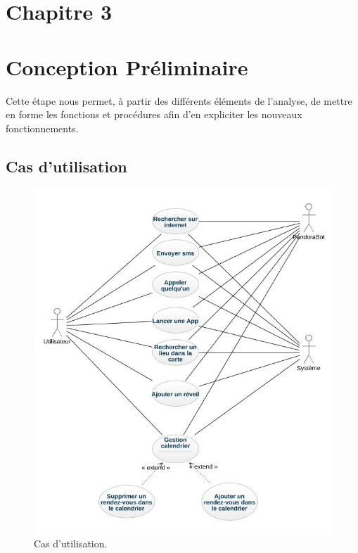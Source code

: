 \section*{Chapitre 3}
\section{Conception Préliminaire}
\indent Cette étape nous permet, à partir des différents éléments de l'analyse, de mettre en forme les fonctions et procédures afin d'en expliciter les nouveaux fonctionnements.

\subsection{Cas d'utilisation}
\begin{figure}[h]
\centering
\includegraphics[scale=0.5]{./diagrammes/UsecaseDiagram.jpeg}
\caption{Cas d'utilisation.\label{fig2}}
\end{figure}

